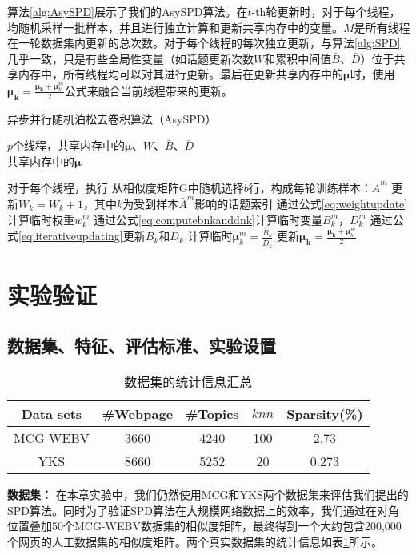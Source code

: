 算法\ref{alg:AsySPD}展示了我们的AsySPD算法。在$t$-th轮更新时，对于每个线程，均随机采样一批样本，并且进行独立计算和更新共享内存中的变量。$M$是所有线程在一轮数据集内更新的总次数。对于每个线程的每次独立更新，与算法\ref{alg:SPD}几乎一致，只是有些全局性变量（如话题更新次数$W$和累积中间值$\bar{B}$、$\bar{D}$）位于共享内存中，所有线程均可以对其进行更新。最后在更新共享内存中的$\bm{\mu}$时，使用$\bm{\mu_k} = \frac{\bm{\mu_k}+\bm{\mu}^m_k}{2}$公式来融合当前线程带来的更新。
\begin{algorithm}[!htbp]
    \caption{异步并行随机泊松去卷积算法（AsySPD）}\label{alg:AsySPD}
    \hspace*{0.02in}{\bf 初始化:}
    $p$个线程，共享内存中的$\bm{\mu}$、$W$、$\bar{B}$、$\bar{D}$\\
    \hspace*{0.02in}{\bf Output:}
    共享内存中的$\bm{\mu}$
    \begin{algorithmic}
          \State 对于每个线程，执行
            \State 从相似度矩阵G中随机选择$b$行，构成每轮训练样本：$\bar{A}^m$
            \State 更新$W_k = W_k + 1$，其中$k$为受到样本$\bar{A}^m$影响的话题索引
            \State 通过公式\eqref{eq:weightupdate}计算临时权重$w^m_k$
            \State 通过公式\eqref{eq:computebnkanddnk}计算临时变量$B^m_k$，$D^m_k$
            \State 通过公式\eqref{eq:iterativeupdating}更新$\bar{B}_k$和$\bar{D}_k$
            \State 计算临时$\bm{\mu}^m_k = \frac{\bar{B}_k}{\bar{D}_k}$
            \State 更新$\bm{\mu_k} = \frac{\bm{\mu_k}+\bm{\mu}^m_k}{2}$
          \EndFor
        \EndFor
    \end{algorithmic}
\end{algorithm}



\section{实验验证}

\subsection{数据集、特征、评估标准、实验设置}

\begin{table}[t!]
\begin{center}
\caption{数据集的统计信息汇总} \label{tab:dataset}
\begin{tabular}{|c|c|c|c|c|}
  \hline
  Data sets & \#Webpage & \#Topics & $knn$ & Sparsity(\%)\\
  \hline\hline
  MCG-WEBV & 3660 & 4240 & 100 & 2.73\\
  \hline
  YKS & 8660 & 5252 & 20 & 0.273\\
  \hline
\end{tabular}
\end{center}
\end{table}
\textbf{数据集：} 在本章实验中，我们仍然使用MCG和YKS两个数据集来评估我们提出的SPD算法。同时为了验证SPD算法在大规模网络数据上的效率，我们通过在对角位置叠加50个MCG-WEBV数据集的相似度矩阵，最终得到一个大约包含200,000个网页的人工数据集的相似度矩阵。两个真实数据集的统计信息如表\ref{tab:dataset}所示。

